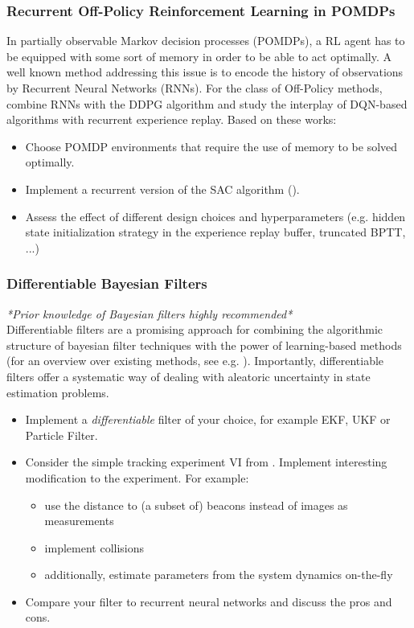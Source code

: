 \documentclass[a4paper]{article}
\begin{document}
\subsubsection{Recurrent Off-Policy Reinforcement Learning in POMDPs}
In partially observable Markov decision processes (POMDPs), a RL agent has to be equipped with some sort of memory in order to be able to act optimally. A well known method addressing this issue is to encode the history of observations by Recurrent Neural Networks (RNNs).
For the class of Off-Policy methods, \citet{heess2015memory} combine RNNs with the DDPG algorithm and \citet{kapturowski2018recurrent} study the interplay of DQN-based algorithms with recurrent experience replay.
Based on these works:
\begin{itemize}
  \item Choose POMDP environments that require the use of memory to be solved optimally.
  \item Implement a recurrent version of the SAC algorithm (\citet{Haarnoja2018a}).
  \item Assess the effect of different design choices and hyperparameters (e.g. hidden state initialization strategy in the experience replay buffer, truncated BPTT, ...)
\end{itemize}

\subsubsection{Differentiable Bayesian Filters}
\textit{*Prior knowledge of Bayesian filters highly recommended*}\\
Differentiable filters are a promising approach for combining the algorithmic structure of bayesian filter techniques with the power of learning-based methods (for an overview over existing methods, see e.g. \citet{kloss2021train}). Importantly, differentiable filters offer a systematic way of dealing with aleatoric uncertainty in state estimation problems.
\begin{itemize}
  \item Implement a \textit{differentiable} filter of your choice, for example EKF, UKF or Particle Filter.
  \item Consider the simple tracking experiment VI from \citet{kloss2021train}. Implement interesting modification to the experiment. For example:
        \begin{itemize}
          \item use the distance to (a subset of) beacons instead of images as measurements
          \item implement collisions
          \item additionally, estimate parameters from the system dynamics on-the-fly
        \end{itemize}
  \item Compare your filter to recurrent neural networks and discuss the pros and cons.
\end{itemize}
\end{document}
